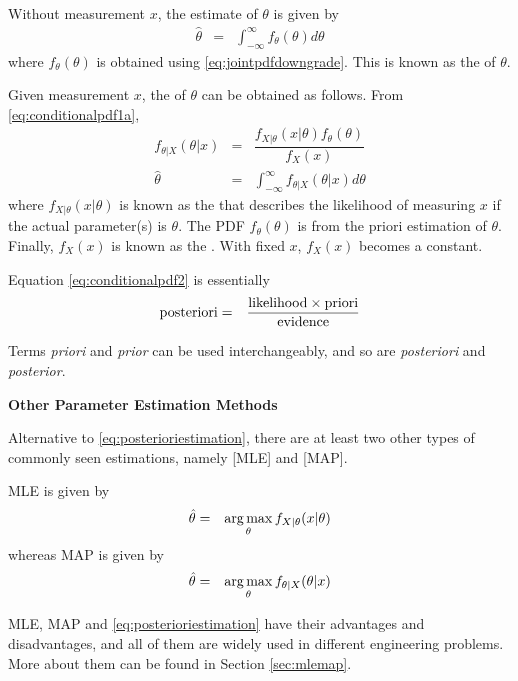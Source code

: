 Without measurement $x$, the estimate of $\theta$ is given by
\begin{eqnarray}
	\hat{\theta} &=& \int_{-\infty}^{\infty} f_\theta(\theta) d\theta \nonumber
\end{eqnarray}
where $f_\theta(\theta)$ is obtained using \eqref{eq:jointpdfdowngrade}. This is known as the  of $\theta$. 

Given measurement $x$, the  of $\theta$ can be obtained as follows. From \eqref{eq:conditionalpdf1a},
\begin{eqnarray}
  f_{\theta|X}(\theta|x) &=& \dfrac{f_{X|\theta}(x|\theta)f_\theta(\theta)}{f_X(x)} \label{eq:conditionalpdf2} \\
  \hat{\theta} &=& \int_{-\infty}^{\infty} f_{\theta|X}(\theta|x) d\theta \label{eq:posterioriestimation}
\end{eqnarray}
where $f_{X|\theta}(x|\theta)$ is known as the  that describes the likelihood of measuring $x$ if the actual parameter(s) is $\theta$. The PDF $f_\theta(\theta)$ is from the priori estimation of $\theta$. Finally, $f_X(x)$ is known as the . With fixed $x$, $f_X(x)$ becomes a constant.

Equation \eqref{eq:conditionalpdf2} is essentially
\begin{eqnarray}
  \textup{posteriori} &=& \dfrac{\textup{likelihood}\times\textup{priori}}{\textup{evidence}} \label{eq:posteriorimemo}
\end{eqnarray} 

Terms \textit{priori} and \textit{prior} can be used interchangeably, and so are \textit{posteriori} and \textit{posterior}.

\begin{mdframed}
\noindent \textbf{Other Parameter Estimation Methods}

Alternative to \eqref{eq:posterioriestimation}, there are at least two other types of commonly seen estimations, namely [MLE] and [MAP].

MLE is given by
\begin{eqnarray}
  \hat{\theta} &=& \operatorname*{arg\,max}_\theta f_{X|\theta}(x|\theta) \nonumber
\end{eqnarray}
whereas MAP is given by
\begin{eqnarray}
  \hat{\theta} &=& \operatorname*{arg\,max}_\theta f_{\theta|X}(\theta|x) \nonumber
\end{eqnarray}

MLE, MAP and \eqref{eq:posterioriestimation} have their advantages and disadvantages, and all of them are widely used in different engineering problems. More about them can be found in Section \ref{sec:mlemap}.

\end{mdframed}

